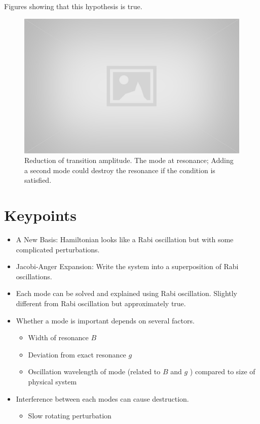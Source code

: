 \documentclass[%
preprint,
 amsmath,amssymb,
 aps,
]{revtex4-1}
\begin{document}
Figures showing that this hypothesis is true.

\begin{figure}[!htbp]
    \centering
    \includegraphics[width=\textwidth]{assets/placeholder.jpg}
    \caption{Reduction of transition amplitude. The mode at resonance; Adding a second mode could destroy the resonance if the condition is satisfied. }
    \label{fig:my_label}
\end{figure}



\clearpage
\appendix
\section{Keypoints}



\begin{itemize}
    \item A New Basis: Hamiltonian looks like a Rabi oscillation but with some complicated perturbations.
    \item Jacobi-Anger Expansion: Write the system into a superposition of Rabi oscillations.
    \item Each mode can be solved and explained using Rabi oscillation. Slightly different from Rabi oscillation but approximately true.
    \item Whether a mode is important depends on several factors.
        \begin{itemize}
            \item Width of resonance $B$
            \item Deviation from exact resonance $g$
            \item Oscillation wavelength of mode (related to $B$ and $g$ ) compared to size of physical system
        \end{itemize}
    \item Interference between each modes can cause destruction.
        \begin{itemize}
            \item Slow rotating perturbation
        \end{itemize}
    
\end{itemize}
    
\end{document}
